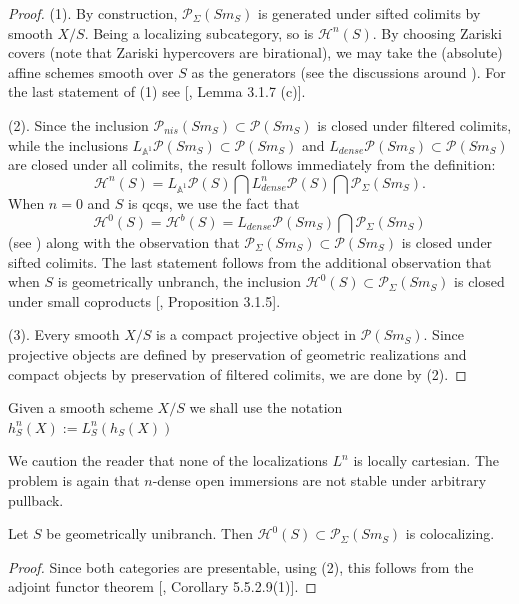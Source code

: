 \begin{proof}
   (1). By construction, $\mathcal{P}_{\Sigma}(Sm_S)$ is generated under sifted colimits by smooth $X/S$. Being a localizing subcategory, so is $\mathcal{H}^{n}(S)$. By choosing Zariski covers (note that Zariski hypercovers are birational), we may take the (absolute) affine schemes smooth over $S$ as the generators (see the discussions around ). For the last statement of (1) see [\cite{0bat}, Lemma 3.1.7 (c)].

(2). Since the inclusion $\mathcal{P}_{nis}(Sm_S)\subset\mathcal{P}(Sm_S)$ is closed under filtered colimits, while the inclusions $L_{\mathbb{A}^1}\mathcal{P}(Sm_S)\subset \mathcal{P}(Sm_S)$ and $L_{dense}\mathcal{P}(Sm_S)\subset \mathcal{P}(Sm_S)$ are closed under all colimits, the result follows immediately from the definition: $$\mathcal{H}^n(S)=L_{\mathbb{A}^1}\mathcal{P}(S)\bigcap L^n_{dense}\mathcal{P}(S)\bigcap \mathcal{P}_{\Sigma}(Sm_S).$$ When $n=0$ and $S$ is qcqs, we use the fact that $$\mathcal{H}^0(S)=\mathcal{H}^b(S)=L_{dense}\mathcal{P}(Sm_S)\bigcap \mathcal{P}_{\Sigma}(Sm_S)$$ (see ) along with the observation that $\mathcal{P}_\Sigma(Sm_S)\subset\mathcal{P}(Sm_S)$ is closed under sifted colimits. The last statement follows from the additional observation that when $S$ is geometrically unbranch, the inclusion $\mathcal{H}^0(S)\subset \mathcal{P}_\Sigma(Sm_S)$ is closed under small coproducts [\cite{0bat}, Proposition 3.1.5].

(3). Every smooth $X/S$ is a compact projective object in $\mathcal{P}(Sm_S)$. Since projective objects are defined by preservation of geometric realizations and compact objects by preservation of filtered colimits, we are done by (2).
\end{proof}
Given a smooth scheme $X/S$ we shall use the notation  $h^n_S(X):=L^n_S(h_S(X))$

\begin{rem}
We caution the reader that none of the localizations $L^n$ is locally cartesian. The problem is again that $n$-dense open immersions are not stable under arbitrary pullback.
\end{rem}
\begin{cor}
Let $S$ be geometrically unibranch. Then $\mathcal{H}^0(S)\subset \mathcal{P}_\Sigma(Sm_S)$ is colocalizing.
\end{cor}
\begin{proof}
    Since both categories are presentable, using (2), this follows from the adjoint functor theorem [\cite{lurie2009higher}, Corollary 5.5.2.9(1)].
\end{proof}

